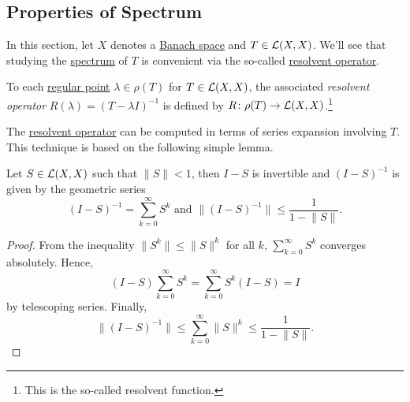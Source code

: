 \subsection{Properties of Spectrum}
In this section, let \(X\) denotes a \hyperref[def:Banach-space]{Banach space} and \(T\in \mathcal{\MakeUppercase{l}} (X, X)\). We'll see that studying the \hyperref[def:spectrum-point]{spectrum} of \(T\) is convenient via the so-called \hyperref[def:resolvent-op]{resolvent operator}.

\begin{definition}\label{def:resolvent-op}
	To each \hyperref[def:regular-point]{regular point} \(\lambda \in \rho (T)\) for \(T\in \mathcal{\MakeUppercase{l}} (X, X)\), the associated \emph{resolvent operator} \(R(\lambda) = (T-\lambda I)^{-1}\) is defined by \(R\colon \rho (T) \to \mathcal{\MakeUppercase{l}} (X, X)\).\footnote{This is the so-called resolvent function.}
\end{definition}

The \hyperref[def:resolvent-op]{resolvent operator} can be computed in terms of series expansion involving \(T\). This technique is based on the following simple lemma.

\begin{lemma}\label{lma:Von-Neumann}
	Let \(S\in \mathcal{\MakeUppercase{l}} (X, X)\) such that \(\lVert S \rVert < 1\), then \(I-S\) is invertible and \((I-S)^{-1} \) is given by the geometric series
	\[
		(I-S)^{-1} = \sum_{k=0} ^{\infty} S^k \text{ and }\lVert (I-S)^{-1} \rVert \leq \frac{1}{1 - \lVert S \rVert} .
	\]
\end{lemma}
\begin{proof}
	From the inequality \(\lVert S^k \rVert \leq \lVert S \rVert ^k\) for all \(k\), \(\sum_{k=0}^{\infty} S^k\) converges absolutely. Hence,
	\[
		(I-S) \sum_{k=0}^{\infty} S^k = \sum_{k=0}^{\infty} S^k(I-S) = I
	\]
	by telescoping series. Finally,
	\[
		\lVert (I-S)^{-1} \rVert \leq \sum_{k=0}^{\infty} \lVert S \rVert ^k \leq \frac{1}{1 - \lVert S \rVert }.
	\]
\end{proof}

